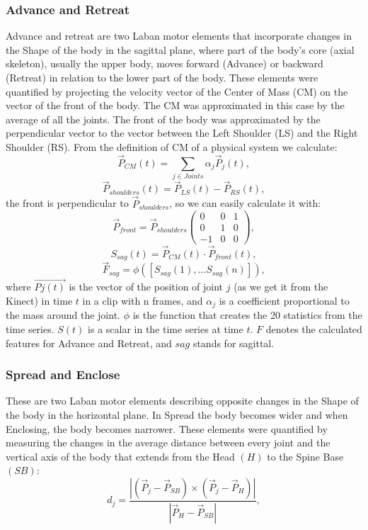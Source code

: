 \subsubsection{Advance and Retreat}
Advance and retreat are two Laban motor elements that incorporate changes in the
Shape of the body in the sagittal plane, where part of the body's core (axial
skeleton), usually the upper body, moves forward (Advance) or backward (Retreat)
in relation to the lower part of the body. These elements were quantified by
projecting the velocity vector of the Center of Mass (CM) on the vector of the
front of the body. The CM was approximated in this case by the average of all
the joints. The front of the body was approximated by the perpendicular vector
to the vector between the Left Shoulder (LS) and the Right Shoulder (RS). From
the definition of CM of a physical system we calculate:
\begin{equation}
\vec{P}_{CM}(t) = \sum_{j \in Joints} \alpha_{j}\vec{P}_{j}(t),
\end{equation}
\begin{equation}
\vec{P}_{shoulders}(t)=\vec{P}_{LS}(t)-\vec{P}_{RS}(t),
\end{equation}
the front is perpendicular to $\vec{P}_{shoulders}$, so we can easily calculate it with:
\[\vec{P}_{front}=\vec{P}_{shoulders}\left( \begin{array}{ccc}
0 & 0 & 1 \\
0 & 1 & 0 \\
-1 & 0 & 0 \end{array} \right),\]
\begin{equation}
S_{sag}(t) = \vec{P}_{CM}(t)\cdot\vec{P}_{front}(t),
\end{equation}
\begin{equation}
\vec{F}_{sag} = \phi([S_{sag}(1), \ldots S_{sag}(n)]),
\end{equation}
where $\vec{Pj(t)}$  is the vector of the position of joint $j$ (as we get it
from the Kinect) in time $t$ in a clip with n frames, and $\alpha_{j}$ is a
coefficient proportional to the mass around the joint. $\phi$ is the function
that creates the 20 statistics from the time series.
$S(t)$ is a scalar in the time series at time $t$.  $F$ denotes the calculated
features for Advance and Retreat, and $sag$ stands for sagittal.
\subsubsection{Spread and Enclose}
These are two Laban motor elements describing opposite changes in the Shape of
the body in the horizontal plane. In Spread the body becomes wider and when
Enclosing, the body becomes narrower. These elements were quantified by
measuring the changes in the average distance between every joint and the
vertical axis of the body that extends from the Head $(H)$ to the Spine Base
$(SB)$:
\begin{equation}
d_{j} = \frac{\left|(\vec{P}_{j}-\vec{P}_{SB})\times
(\vec{P}_{j}-\vec{P}_{H})\right|}{\left|\vec{P}_{H}-\vec{P}_{SB}\right|},
\end{equation}

